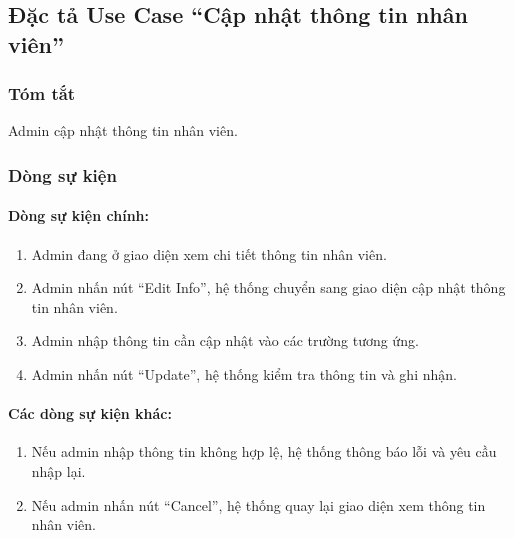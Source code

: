 \subsection{Đặc tả Use Case ``Cập nhật thông tin nhân viên''}

\subsubsection{Tóm tắt}
Admin cập nhật thông tin nhân viên.

\subsubsection{Dòng sự kiện}
\paragraph{\textbf{Dòng sự kiện chính:}}
\begin{enumerate}
  \item Admin đang ở giao diện xem chi tiết thông tin nhân viên.
  \item Admin nhấn nút ``Edit Info'', hệ thống chuyển sang giao diện cập nhật thông tin nhân viên.
  \item Admin nhập thông tin cần cập nhật vào các trường tương ứng.
  \item Admin nhấn nút ``Update'', hệ thống kiểm tra thông tin và ghi nhận.
\end{enumerate}

\paragraph{\textbf{Các dòng sự kiện khác:}}
\begin{enumerate}
  \item Nếu admin nhập thông tin không hợp lệ, hệ thống thông báo lỗi và yêu cầu nhập lại.
  \item Nếu admin nhấn nút ``Cancel'', hệ thống quay lại giao diện xem thông tin nhân viên.
\end{enumerate}

